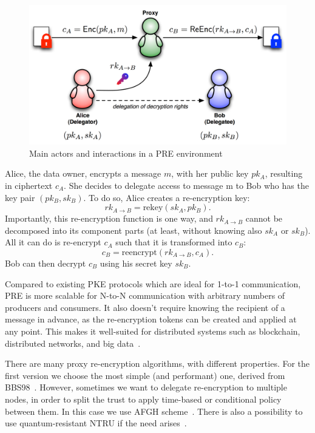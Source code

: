 \documentclass[notitlepage,longbibliography]{revtex4-1}
\begin{document}
\begin{figure}
\centering
    \includegraphics[width=0.6\columnwidth]{pdf/pre.png}  %
    \caption{Main actors and interactions in a PRE environment}
    \label{fig:pre}
\end{figure}

Alice, the data owner, encrypts a message $m$, with her public key $pk_A$, resulting in ciphertext $c_A$.
She decides to delegate access to message m to Bob who has the key pair $(pk_B, sk_B)$.
To do so, Alice creates a re-encryption key:
$$rk_{A\rightarrow B} = \text{rekey}(sk_A, pk_B).$$
Importantly, this re-encryption function is one way, and $rk_{A\rightarrow B}$ cannot be decomposed into its component parts
(at least, without knowing also $sk_A$ or $sk_B$).
All it can do is re-encrypt $c_A$ such that it is transformed into $c_B$:
$$c_B = \text{reencrypt}(rk_{A\rightarrow B}, c_{A}).$$
Bob can then decrypt $c_{B}$ using his secret key $sk_{B}$.

Compared to existing PKE protocols which are ideal for 1-to-1 communication, PRE is more scalable for N-to-N communication
with arbitrary numbers of producers and consumers.
It also doesn't require knowing the recipient of a message in advance, as the re-encryption tokens can be created and applied at any point.
This makes it well-suited for distributed systems such as blockchain, distributed networks, and big data~\cite{web:nucypher-hadoop}.

There are many proxy re-encryption algorithms, with different properties.
For the first version we choose the most simple (and performant) one, derived from BBS98~\cite{BBS98}.
However, sometimes we want to delegate re-encryption to multiple nodes, in order to split the trust to apply time-based or conditional policy
between them.
In this case we use AFGH scheme~\cite{AFGH}.
There is also a possibility to use quantum-resistant NTRU if the need arises~\cite{ntru,ntrureencrypt}.
\end{document}
